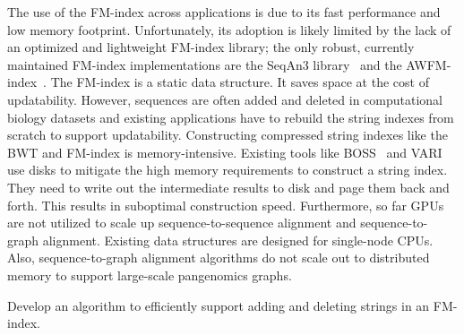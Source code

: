 
The use of the FM-index across applications is due to its fast performance and low memory footprint. Unfortunately, its adoption is likely limited by the lack of an optimized and lightweight FM-index library; the only robust, currently maintained FM-index implementations are the SeqAn3 library~\cite{Reinert2017} and the AWFM-index~\cite{Anderson2021}. 
%
The FM-index is a static data structure. It saves space at the cost of updatability. However, sequences are often added and deleted in computational biology datasets and existing applications have to rebuild the string indexes from scratch to support updatability.
%
Constructing compressed string indexes like the BWT and FM-index is memory-intensive. Existing tools like BOSS~\cite{Bowe2012} and VARI~\cite{Muggli2019} use disks to mitigate the high memory requirements to construct a string index. They need to write out the intermediate results to disk and page them back and forth. This results in suboptimal construction speed.
%
Furthermore, so far GPUs are not utilized to scale up sequence-to-sequence alignment and sequence-to-graph alignment. Existing data structures are designed for single-node CPUs. Also, sequence-to-graph alignment algorithms do not scale out to distributed memory to support large-scale pangenomics graphs.

\begin{rproblem}
Develop an algorithm to efficiently support adding and deleting strings in an FM-index.
\label{rpob:dynamic-fmindex}
\end{rproblem}

